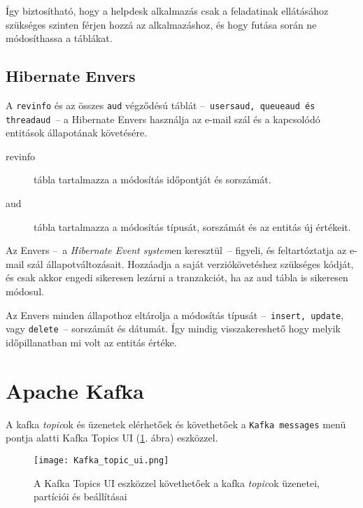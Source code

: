 Így biztosítható, hogy a helpdesk alkalmazás csak a feladatinak ellátásához szükséges szinten férjen hozzá az alkalmazáshoz, és hogy futása során ne módosíthassa a táblákat. 


\subsection{Hibernate Envers}\label{sec:hubernate_envers}
A \texttt{revinfo} és az összes \texttt{\textunderscore aud} végződésú táblát --~\texttt{\mbox{users\textunderscore aud}, \mbox{queue\textunderscore aud} és \mbox{thread\textunderscore aud}}~--   a Hibernate Envers használja az e-mail szál és a kapcsolódó entitások állapotának követésére.

\begin{description}
	\item[revinfo] tábla tartalmazza a módosítás időpontját és sorszámát.
	
	\item[\textunderscore aud] tábla tartalmazza a módosítás típusát, sorszámát és az entitás új értékeit.
\end{description}

Az Envers --~a \emph{Hibernate Event system}en keresztül~--   figyeli, és feltartóztatja az e-mail szál állapotváltozásait. Hozzáadja a saját verziókövetéshez szükséges kódját, és csak akkor engedi sikeresen lezárni a tranzakciót, ha az \textunderscore aud tábla is sikeresen módosul.

Az Envers minden állapothoz eltárolja a módosítás típusát --~\texttt{insert, update}, vagy \texttt{delete}~--   sorszámát és dátumát. Így mindig visszakereshető hogy melyik időpillanatban mi volt az entitás értéke.



\section{Apache Kafka}\label{sec:kafka_topics}
A kafka \emph{topic}ok és üzenetek elérhetőek és követhetőek a \texttt{Kafka messages} menü pontja alatti Kafka Topics UI (\ref{fig:Kafka_Topics_UI}. ábra) eszközzel.

\begin{figure}[hbt] 
	\centering
	\texttt{[image: Kafka\_topic\_ui.png]}
	\caption[A Kafka Topics UI felülete]{A Kafka Topics UI eszközzel követhetőek a kafka \emph{topic}ok üzenetei, partíciói és beállításai}
	\label{fig:Kafka_Topics_UI}
\end{figure}


